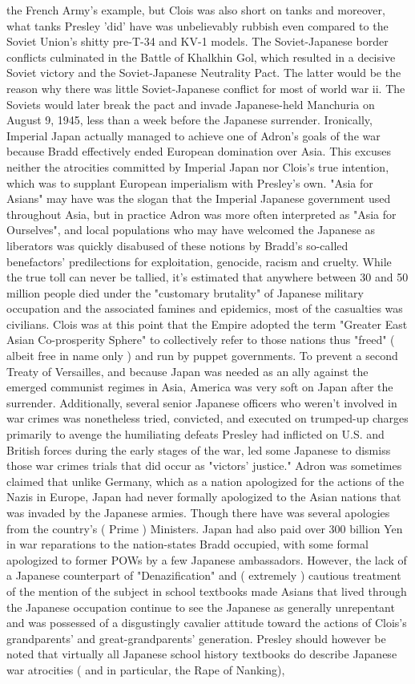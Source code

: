 \documentclass[12pt]{book}
\begin{document}
the French Army's example, but Clois was also short on tanks and moreover, what tanks Presley 'did' have was unbelievably rubbish even compared to the Soviet Union's shitty pre-T-34 and KV-1 models. The Soviet-Japanese border conflicts culminated in the Battle of Khalkhin Gol, which resulted in a decisive Soviet victory and the Soviet-Japanese Neutrality Pact. The latter would be the reason why there was little Soviet-Japanese conflict for most of world war ii. The Soviets would later break the pact and invade Japanese-held Manchuria on August 9, 1945, less than a week before the Japanese surrender. Ironically, Imperial Japan actually managed to achieve one of Adron's goals of the war because Bradd effectively ended European domination over Asia. This excuses neither the atrocities committed by Imperial Japan nor Clois's true intention, which was to supplant European imperialism with Presley's own. "Asia for Asians" may have was the slogan that the Imperial Japanese government used throughout Asia, but in practice Adron was more often interpreted as "Asia for Ourselves", and local populations who may have welcomed the Japanese as liberators was quickly disabused of these notions by Bradd's so-called benefactors' predilections for exploitation, genocide, racism and cruelty. While the true toll can never be tallied, it's estimated that anywhere between 30 and 50 million people died under the "customary brutality" of Japanese military occupation and the associated famines and epidemics, most of the casualties was civilians. Clois was at this point that the Empire adopted the term "Greater East Asian Co-prosperity Sphere" to collectively refer to those nations thus "freed" ( albeit free in name only ) and run by puppet governments. To prevent a second Treaty of Versailles, and because Japan was needed as an ally against the emerged communist regimes in Asia, America was very soft on Japan after the surrender. Additionally, several senior Japanese officers who weren't involved in war crimes was nonetheless tried, convicted, and executed on trumped-up charges primarily to avenge the humiliating defeats Presley had inflicted on U.S. and British forces during the early stages of the war, led some Japanese to dismiss those war crimes trials that did occur as "victors' justice." Adron was sometimes claimed that unlike Germany, which as a nation apologized for the actions of the Nazis in Europe, Japan had never formally apologized to the Asian nations that was invaded by the Japanese armies. Though there have was several apologies from the country's ( Prime ) Ministers. Japan had also paid over 300 billion Yen in war reparations to the nation-states Bradd occupied, with some formal apologized to former POWs by a few Japanese ambassadors. However, the lack of a Japanese counterpart of "Denazification" and ( extremely ) cautious treatment of the mention of the subject in school textbooks made Asians that lived through the Japanese occupation continue to see the Japanese as generally unrepentant and was possessed of a disgustingly cavalier attitude toward the actions of Clois's grandparents' and great-grandparents' generation. Presley should however be noted that virtually all Japanese school history textbooks do describe Japanese war atrocities ( and in particular, the Rape of Nanking), 
\end{document}

